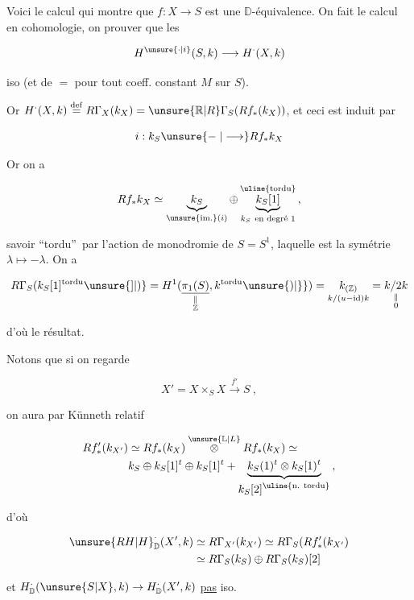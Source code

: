 

Voici  le  calcul qui montre que $f:X\to S$ est une $\mathbb D$-équivalence. On fait le calcul en cohomologie, on  prouver que les

\[
H^{\unsure{\cdot|i}}(S,k)\longrightarrow H^{\cdot}(X,k)
\]

iso (et de $=$ pour tout coeff. constant  $M$ sur $S$).

Or $H^{\cdot}(X,k)\overset{\mathrm{def}}=R\Gamma_X(k_X)=\unsure{\mathbb R|R}\Gamma_S(Rf_*(k_X))$, et ceci est induit par

\[
i:k_S\unsure{\relbar|\longrightarrow} Rf_*k_X
\]

Or on a

\[
Rf_*k_X\simeq\underbrace{k_S}_{\text{\unsure{im.}}(i)}\oplus
\underbrace{k_S[1]}_{k_S\ \text{en degré }1}^{\text{\uline{tordu}}}\,,
\]

savoir \textquotedblleft tordu\textquotedblright\ par l'action de monodromie de $S=S^1$, laquelle est la symétrie  $\lambda\longmapsto-\lambda$. On a

\[
R\Gamma_S(k_S[1]^{\text{tordu}}\unsure{]|)}=
H^1(\underset{\substack{\parallel\\\mathbb Z}}{\underline{\pi_1(S)}},k^{\text{tordu}}\unsure{)|\}} )=
\underset{\scriptstyle k/(u-\mathrm{id})k}{k_{(\mathbb Z)}}=\underset{\substack{\parallel\\0}}{k/2k}
\]

d'où le résultat.

Notons que si on regarde

\[
X'=X\times_S X\xrightarrow{f'}S\ ,
\]

on aura par Künneth relatif

\[
\begin{aligned}
Rf'_*(k_{X'})&\simeq Rf_*(k_X)\mathbin{\overset{\unsure{\mathbb L|L}}{\otimes}}Rf_*(k_X)\simeq\\
&k_S\oplus k_S[1]^t\oplus k_S[1]^t+
\underbrace{k_S(1)^t\otimes k_S[1)^t}_{\displaystyle k_S[2]^{\text{\uline{n. tordu}}}}\, ,
\end{aligned}
\]

 d'où

\[
\begin{aligned}
\unsure{R H|H}^{\cdot}_{\mathbb D}(X',k)&\simeq R\Gamma_{X'}(k_{X'})\simeq R\Gamma_S(Rf'_*(k_{X'})\\
&\simeq R\Gamma_S(k_S)\oplus R\Gamma_S(k_S)[2]
\end{aligned}
\]

et $H^{\cdot}_{\mathbb D}(\unsure{S|X},k)\to H^{\cdot}_{\mathbb D}(X',k)$  \uline{pas} iso.

